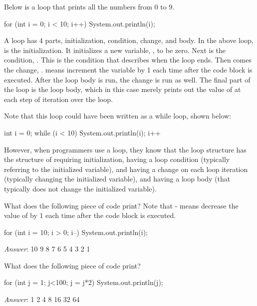 Below is a  loop that prints all the numbers from 0 to 9.

\begin{code}
for (int i = 0; i < 10; i++)
{
    System.out.println(i);
}
\end{code}

A  loop has 4 parts, initialization, condition, change, and body. In the above  loop,  is the initialization. It initializes a new variable, , to be zero. Next is the condition, . This is the condition that describes when the loop ends. Then comes the change, .  means increment the  variable by 1 each time after the code block is executed. After the loop body is run, the change is run as well.  The final part of the  loop is the loop body, which in this case merely prints out the value of  at each step of iteration over the  loop.

Note that this loop could have been written as a while loop, shown below:
\begin{code}
int i = 0;
while (i < 10)  
{
    System.out.println(i);
    i++
}
\end{code}
%
However, when programmers use a  loop, they know that the loop structure has the structure of requiring initialization, having a loop condition (typically referring to the initialized variable), and having a change on each loop iteration (typically changing the initialized variable), and having a loop body
(that typically does not change the initialized variable).

\begin{example}
What does the following piece of code print?
Note that - means decrease the value of  by 1 each time after the code block is executed.

\begin{code}
for (int i = 10; i > 0; i--)
{
    System.out.println(i);
}
\end{code}

\emph{Answer}: 
10
9
8
7
6
5
4
3
2
1
\end{example}

\begin{example}
What does the following piece of code print?

\begin{code}
for (int j = 1; j<100; j = j*2)
{
    System.out.println(j);
}
\end{code}

\emph{Answer}: 
1
2
4
8
16
32
64
\end{example}

